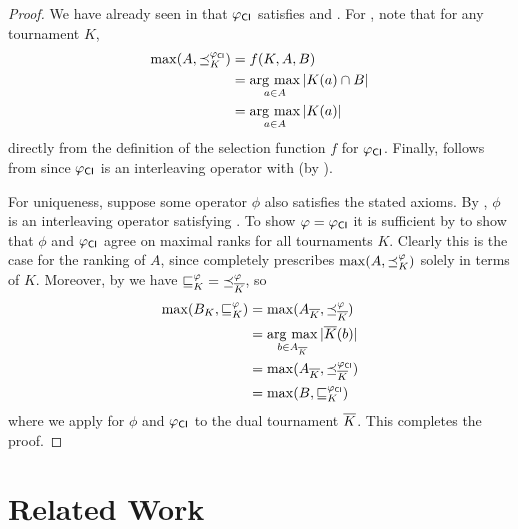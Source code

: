 \begin{proof}
    We have already seen in  that
    ${\varphi_{\mathsf{CI}}}$ satisfies \dualaxiom{} and \chaindef{}. For
    \argmaxaxiom{}, note that for any tournament $K$,
    \begin{align*}
        \max(A, {\preceq_K^{{\varphi_{\mathsf{CI}}}}})
        &= f(K, A, B) \\
        &= \operatorname*{arg\ max}_{a \in A}{|K(a) \cap B|} \\
        &= \operatorname*{arg\ max}_{a \in A}{|K(a)|}
    \end{align*}
    directly from the definition of the selection function $f$ for
    ${\varphi_{\mathsf{CI}}}$. Finally, \rankremoval{} follows from
     since ${\varphi_{\mathsf{CI}}}$ is an interleaving
    operator with \smi{} (by ).

    For uniqueness, suppose some operator $\phi$ also satisfies the stated
    axioms. By , $\phi$ is an interleaving
    operator satisfying \smi{}. To show $\varphi = {\varphi_{\mathsf{CI}}}$ it is
    sufficient by  to show that
    $\phi$ and ${\varphi_{\mathsf{CI}}}$ agree on maximal ranks for all tournaments $K$.
    Clearly this is the case for the ranking of $A$, since \argmaxaxiom{}
    completely prescribes $\max(A, {\preceq_K^\varphi})$ solely in terms of $K$.
    Moreover, by \dualaxiom{} we have ${\sqsubseteq_K^\varphi} =
    {\preceq_{{\overline{K}}}^\varphi}$, so
    \begin{align*}
        \max(B_K, {\sqsubseteq_K^\varphi})
        &= \max(A_{{\overline{K}}}, {\preceq_{{\overline{K}}}^\varphi}) \\
        &= \operatorname*{arg\ max}_{b \in A_{{\overline{K}}}}|{\overline{K}}(b)| \\
        &= \max(A_{{\overline{K}}}, {\preceq_{{\overline{K}}}^{{\varphi_{\mathsf{CI}}}}}) \\
        &= \max(B, {\sqsubseteq_K^{{\varphi_{\mathsf{CI}}}}})
    \end{align*}
    where we apply \argmaxaxiom{} for $\phi$ and ${\varphi_{\mathsf{CI}}}$ to the dual
    tournament ${\overline{K}}$. This completes the proof.
\end{proof}

\section{Related Work}
\label{tourn_sec_related_work}

